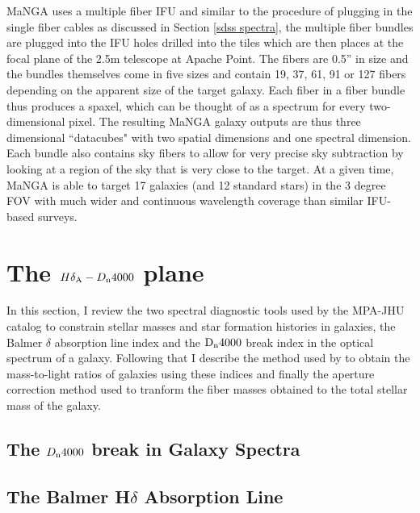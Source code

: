 MaNGA uses a multiple fiber IFU \citep{drory_manga_2015} and similar to the procedure of plugging in the single fiber cables as discussed in Section \ref{sdss spectra}, the multiple fiber bundles are plugged into the IFU holes drilled into the tiles which are then places at the focal plane of the 2.5m telescope at Apache Point. The fibers are 0.5'' in size and the bundles themselves come in five sizes and contain 19, 37, 61, 91 or 127 fibers depending on the apparent size of the target galaxy. Each fiber in a fiber bundle thus produces a spaxel, which can be thought of as a spectrum for every two-dimensional pixel. The resulting MaNGA galaxy outputs are thus three dimensional ``datacubes" with two spatial dimensions and one spectral dimension. Each bundle also contains sky fibers to allow for very precise sky subtraction by looking at a region of the sky that is very close to the target. At a given time, MaNGA is able to target 17 galaxies (and 12 standard stars) in the 3 degree FOV with much wider and continuous wavelength coverage than similar IFU-based surveys.\\

\section{The $H\delta_{\rm A}-D_{\rm n}4000$ plane}
\label{indices}

In this section, I review the two spectral diagnostic tools used by the MPA-JHU catalog to constrain stellar masses and star formation histories in galaxies, the Balmer $\delta$ absorption line index and the ${\rm D}_{\rm n}4000$ break index in the optical spectrum of a galaxy. Following that I describe the method used by \citet{kauffmann_stellar_2003} to obtain the mass-to-light ratios of galaxies using these indices and finally the aperture correction method used to tranform the fiber masses obtained to the total stellar mass of the galaxy.\\

\subsection{The $D_{\rm n}4000$ break in Galaxy Spectra}
\label{d4000}


\subsection{The Balmer H$\delta$ Absorption Line}
\label{hdelta}

